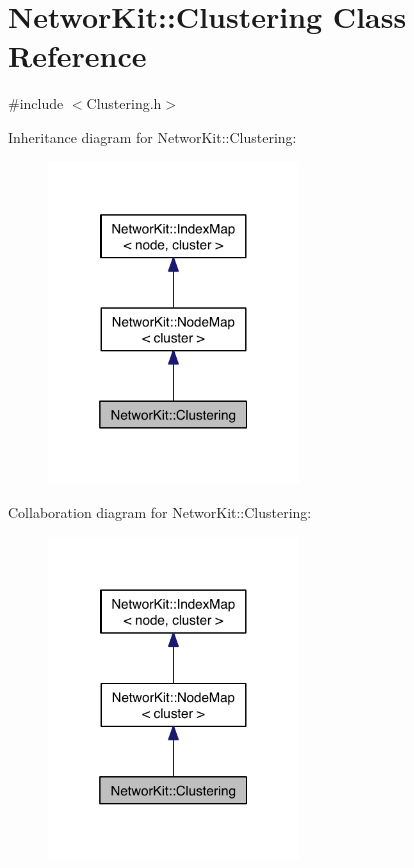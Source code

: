 \hypertarget{class_networ_kit_1_1_clustering}{\section{Networ\-Kit\-:\-:Clustering Class Reference}
\label{class_networ_kit_1_1_clustering}
}


{\ttfamily \#include $<$Clustering.\-h$>$}



Inheritance diagram for Networ\-Kit\-:\-:Clustering\-:\nopagebreak
\begin{figure}[H]
\begin{center}
\leavevmode
\includegraphics[width=188pt]{class_networ_kit_1_1_clustering__inherit__graph}
\end{center}
\end{figure}


Collaboration diagram for Networ\-Kit\-:\-:Clustering\-:\nopagebreak
\begin{figure}[H]
\begin{center}
\leavevmode
\includegraphics[width=188pt]{class_networ_kit_1_1_clustering__coll__graph}
\end{center}
\end{figure}
